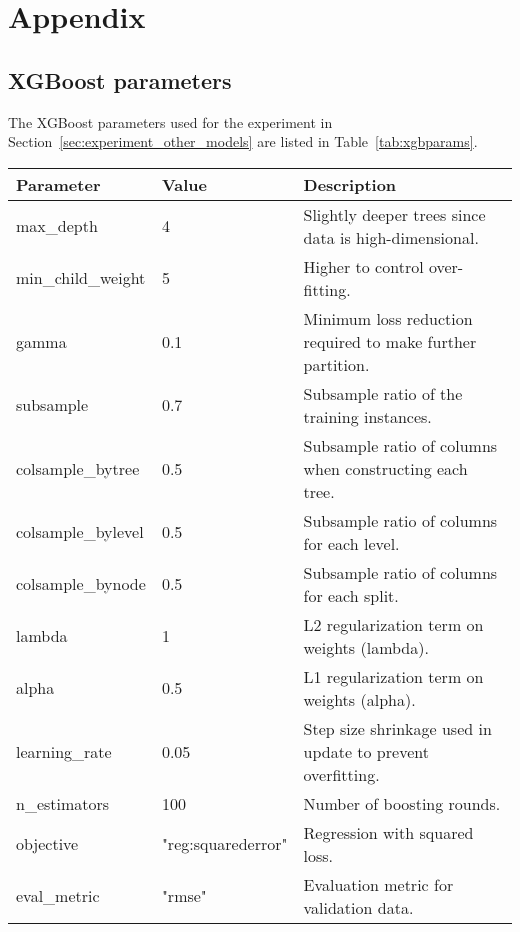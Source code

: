 \appendix
\onecolumn
\section{Appendix}\label{sec:appendix}
\subsection{XGBoost parameters}\label{sec:XGBoost_parameters}
The XGBoost parameters used for the experiment in Section~\ref{sec:experiment_other_models} are listed in Table~\ref{tab:xgbparams}.

\begin{table*}[ht]
\centering
\caption{XGBoost Parameter Configuration}
\label{tab:xgbparams}
\begin{tabular}{llp{10cm}}
\toprule
Parameter & Value & Description \\
\midrule
max\_depth & 4 & Slightly deeper trees since data is high-dimensional. \\
min\_child\_weight & 5 & Higher to control over-fitting. \\
gamma & 0.1 & Minimum loss reduction required to make further partition. \\
subsample & 0.7 & Subsample ratio of the training instances. \\
colsample\_bytree & 0.5 & Subsample ratio of columns when constructing each tree. \\
colsample\_bylevel & 0.5 & Subsample ratio of columns for each level. \\
colsample\_bynode & 0.5 & Subsample ratio of columns for each split. \\
lambda & 1 & L2 regularization term on weights (lambda). \\
alpha & 0.5 & L1 regularization term on weights (alpha). \\
learning\_rate & 0.05 & Step size shrinkage used in update to prevent overfitting. \\
n\_estimators & 100 & Number of boosting rounds. \\
objective & "reg:squarederror" & Regression with squared loss. \\
eval\_metric & "rmse" & Evaluation metric for validation data. \\
\bottomrule
\end{tabular}
\end{table*}
